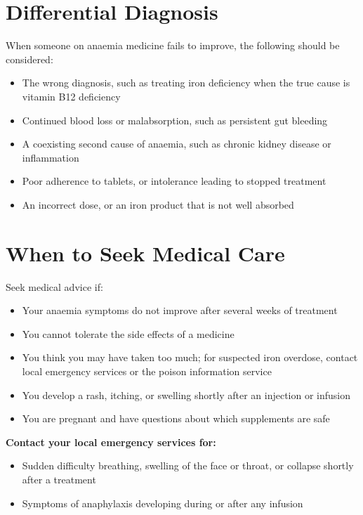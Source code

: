 \section*{Differential Diagnosis}
When someone on anaemia medicine fails to improve, the following should be considered:
\begin{itemize}
    \item The wrong diagnosis, such as treating iron deficiency when the true cause is vitamin B12 deficiency
    \item Continued blood loss or malabsorption, such as persistent gut bleeding
    \item A coexisting second cause of anaemia, such as chronic kidney disease or inflammation
    \item Poor adherence to tablets, or intolerance leading to stopped treatment
    \item An incorrect dose, or an iron product that is not well absorbed
\end{itemize}

\section*{When to Seek Medical Care}
Seek medical advice if:
\begin{itemize}
    \item Your anaemia symptoms do not improve after several weeks of treatment
    \item You cannot tolerate the side effects of a medicine
    \item You think you may have taken too much; for suspected iron overdose, contact local emergency services or the poison information service
    \item You develop a rash, itching, or swelling shortly after an injection or infusion
    \item You are pregnant and have questions about which supplements are safe
\end{itemize}

\textbf{Contact your local emergency services for:}
\begin{itemize}
    \item Sudden difficulty breathing, swelling of the face or throat, or collapse shortly after a treatment
    \item Symptoms of anaphylaxis developing during or after any infusion
\end{itemize}

